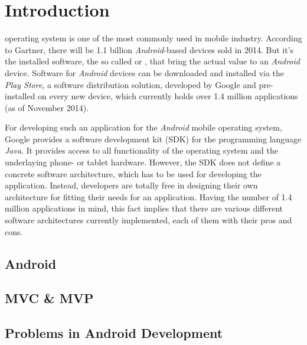 \section{Introduction}

 operating system is one of the most 
commonly used in mobile industry. According to Gartner, there will be 1.1 
billion \emph{Android}-based devices sold in 2014.
But it's the installed software, the so called  or 
, that bring the actual value to an \emph{Android} device.
Software for \emph{Android} devices can be downloaded and installed via the 
\emph{Play Store}, a software distribution solution, developed by Google and 
pre-installed on every new device, which currently holds over 1.4 million 
applications (as of November 2014).

For developing such an application for the \emph{Android} mobile operating 
system, Google provides a software development kit (SDK) for the programming 
language \emph{Java}. It provides access to all functionality of the 
operating system and the underlaying phone- or tablet hardware.
However, the SDK does not define a concrete software architecture, which has to 
be used for developing the application. Instead, developers are totally free in 
designing their own architecture for fitting their needs for an application.
Having the number of 1.4 million applications in mind, this fact implies that 
there are various different software architectures currently implemented, each 
of them with their pros and cons.


	\subsection{Android}
	
	\subsection{MVC \& MVP}
	
	\subsection{Problems in Android Development}
	
